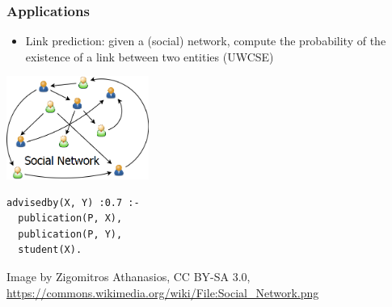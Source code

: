 \documentclass[trans]{beamer}
\begin{document}
\begin{frame}[fragile]
  \frametitle{Applications}
\begin{itemize}
\item Link prediction: given a (social) network, compute the probability of the existence of a link between two
entities (UWCSE)
  \end{itemize}
\begin{center}
\includegraphics[width=0.35\textwidth]{social.png}
\end{center}
\begin{verbatim}
advisedby(X, Y) :0.7 :-
  publication(P, X),
  publication(P, Y),
  student(X).
\end{verbatim}
\begin{tiny}
Image by Zigomitros Athanasios, CC BY-SA 3.0, \url{https://commons.wikimedia.org/wiki/File:Social_Network.png}
\end{tiny}
\end{frame}
\end{document}
